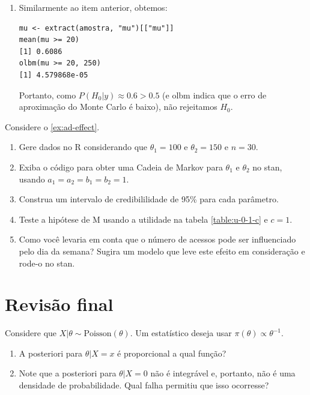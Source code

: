 {\begin{enumerate}[label=(\alph*)]
  \item Similarmente ao item anterior, obtemos:
	\begin{verbatim}
mu <- extract(amostra, "mu")[["mu"]]
mean(mu >= 20)
[1] 0.6086
olbm(mu >= 20, 250)
[1] 4.579868e-05
	\end{verbatim}
	Portanto, como $P(H_{0}|y) \approx 0.6 > 0.5$
	(e olbm indica que o erro de aproximação do
	 Monte Carlo é baixo),
	não rejeitamos $H_{0}$.
 \end{enumerate}
}{}

\begin{exercise}
 Considere o \cref{ex:ad-effect}.
 \begin{enumerate}[label=(\alph*)]
  \item Gere dados no R considerando que $\theta_{1}=100$ e $\theta_{2}=150$ e $n=30$.
	\item Exiba o código para obter uma Cadeia de Markov para $\theta_{1}$ e $\theta_{2}$ no stan, usando $a_1 = a_2 = b_1 = b_2 = 1$.
	\item Construa um intervalo de credibililidade de 95\% para cada parâmetro.
	\item Teste a hipótese de M usando a utilidade na tabela \ref{table:u-0-1-c} e $c=1$.
	\item Como você levaria em conta que o número de acessos pode ser influenciado pelo dia da semana?
	      Sugira um modelo que leve este efeito em consideração e rode-o no stan.
 \end{enumerate}
\end{exercise}


\section{Revisão final}

\begin{exercise}
 Considere que $X|\theta \sim \text{Poisson}(\theta)$.
 Um estatístico deseja usar $\pi(\theta) \propto \theta^{-1}$.
 \begin{enumerate}[label=(\alph*)]
  \item A posteriori para $\theta|X=x$ é proporcional a qual função?
	\item Note que a posteriori para $\theta|X=0$ não é integrável e,
	      portanto, não é uma densidade de probabilidade.
				Qual falha permitiu que isso ocorresse?
 \end{enumerate}
\end{exercise}





